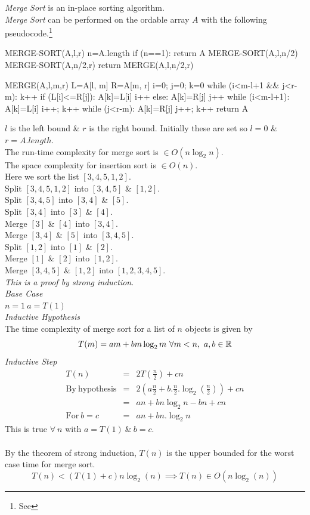 \documentclass[11pt,a4paper]{article}
\begin{document}
\textit{Merge Sort} is an in-place sorting algorithm.\\
\textit{Merge Sort} can be performed on the ordable array $A$ with the following pseudocode.\footnote{See }
\begin{code}
MERGE-SORT(A,l,r)
n=A.length
if (n==1):
  return A
MERGE-SORT(A,l,n/2)
MERGE-SORT(A,n/2,r)
return MERGE(A,l,n/2,r)

MERGE(A,l,m,r)
L=A[l, m]
R=A[m, r]
i=0; j=0; k=0
while (i<m-l+1 && j<r-m):
  k++
  if (L[i]<=R[j]):
    A[k]=L[i]
    i++
  else:
  	A[k]=R[j]
  	j++
while (i<m-l+1):
  A[k]=L[i]
  i++; k++
while (j<r-m):
  A[k]=R[j]
  j++; k++
return A
\end{code}
\nb $l$ is the left bound \& $r$ is the right bound. Initially these are set so $l=0$ \& $r=A.length$.\\

The run-time complexity for merge sort is $\in O(n\log_2n)$.\\
The space complexity for insertion sort is $\in O(n)$.\\

Here we sort the list $[3,4,5,1,2]$.\\
Split $[3,4,5,1,2]$ into $[3,4,5]$ \& $[1,2]$.\\
Split $[3,4,5]$ into $[3,4]$ \& $[5]$.\\
Split $[3,4]$ into $[3]$ \& $[4]$.\\
Merge $[3]$ \& $[4]$ into $[3,4]$.\\
Merge $[3,4]$ \& $[5]$ into $[3,4,5]$.\\
Split $[1,2]$ into $[1]$ \& $[2]$.\\
Merge $[1]$ \& $[2]$ into $[1,2]$.\\
Merge $[3,4,5]$ \& $[1,2]$ into $[1,2,3,4,5]$.\\

\textit{This is a proof by strong induction}.\\
\textit{Base Case}\\
$n=1\ a=T(1)$\\
\textit{Inductive Hypothesis}\\
The time complexity of merge sort for a list of $n$ objects is given by
$$T(m)=am+bm\log_2m\ \forall m<n,\ a,b\in\real$$
\textit{Inductive Step}
\[\begin{array}{rcl}
T(n) &=& 2T\left(\frac{n}{2}\right)+cn\\
\mathrm{By\ hypothesis}&=&2\left(a\frac{n}{2}+b.\frac{n}{2}.\log_2\left(\frac{n}{2}\right)\right)+cn\\
&=& an+bn\log_2n-bn+cn\\
\mathrm{For\ }b=c&=&an+bn.\log_2n
\end{array}\]
This is true $\forall\ n$ with $a=T(1)\ \&\ b=c$.\\\\
By the theorem of strong induction, $T(n)$ is the upper bounded for the worst case time for merge sort.
$$T(n)<(T(1)+c)n\log_2(n)\implies T(n)\in O(n\log_2(n))$$
\end{document}
